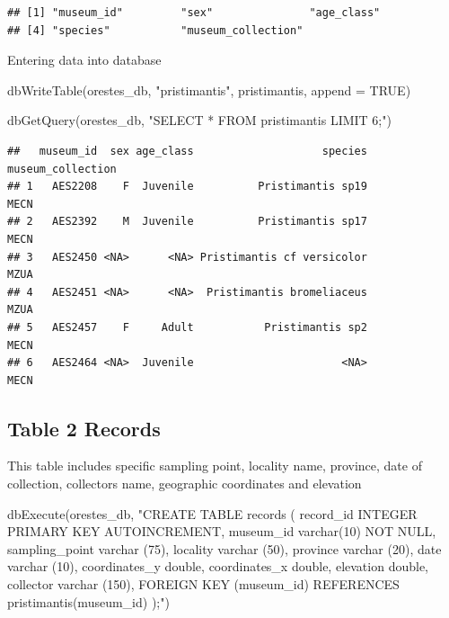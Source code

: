 \documentclass[
]{book}
\newenvironment{Shaded}{\begin{snugshade}}{\end{snugshade}}
\newcommand{\AttributeTok}[1]{\textcolor[rgb]{0.77,0.63,0.00}{#1}}
\newcommand{\ConstantTok}[1]{\textcolor[rgb]{0.00,0.00,0.00}{#1}}
\newcommand{\FunctionTok}[1]{\textcolor[rgb]{0.00,0.00,0.00}{#1}}
\newcommand{\NormalTok}[1]{#1}
\newcommand{\StringTok}[1]{\textcolor[rgb]{0.31,0.60,0.02}{#1}}
\begin{document}
\begin{verbatim}
## [1] "museum_id"         "sex"               "age_class"        
## [4] "species"           "museum_collection"
\end{verbatim}

Entering data into database

\begin{Shaded}
\begin{Highlighting}[]
\FunctionTok{dbWriteTable}\NormalTok{(orestes\_db, }\StringTok{"pristimantis"}\NormalTok{, pristimantis, }\AttributeTok{append =} \ConstantTok{TRUE}\NormalTok{)}

\FunctionTok{dbGetQuery}\NormalTok{(orestes\_db, }\StringTok{"SELECT * FROM pristimantis LIMIT 6;"}\NormalTok{)}
\end{Highlighting}
\end{Shaded}

\begin{verbatim}
##   museum_id  sex age_class                    species museum_collection
## 1   AES2208    F  Juvenile          Pristimantis sp19              MECN
## 2   AES2392    M  Juvenile          Pristimantis sp17              MECN
## 3   AES2450 <NA>      <NA> Pristimantis cf versicolor              MZUA
## 4   AES2451 <NA>      <NA>  Pristimantis bromeliaceus              MZUA
## 5   AES2457    F     Adult           Pristimantis sp2              MECN
## 6   AES2464 <NA>  Juvenile                       <NA>              MECN
\end{verbatim}

\hypertarget{table-2-records}{%
\subsection{Table 2 Records}\label{table-2-records}}

This table includes specific sampling point, locality name, province, date of collection, collectors name, geographic coordinates and elevation

\begin{Shaded}
\begin{Highlighting}[]
\FunctionTok{dbExecute}\NormalTok{(orestes\_db, }\StringTok{"CREATE TABLE records (}
\StringTok{record\_id INTEGER PRIMARY KEY AUTOINCREMENT,}
\StringTok{museum\_id varchar(10) NOT NULL,}
\StringTok{sampling\_point varchar (75),}
\StringTok{locality varchar (50),}
\StringTok{province varchar (20),}
\StringTok{date varchar (10),}
\StringTok{coordinates\_y double,}
\StringTok{coordinates\_x double,}
\StringTok{elevation double,}
\StringTok{collector varchar (150),}
\StringTok{FOREIGN KEY (museum\_id) REFERENCES pristimantis(museum\_id)}
\StringTok{);"}\NormalTok{)}
\end{Highlighting}
\end{Shaded}
\end{document}
